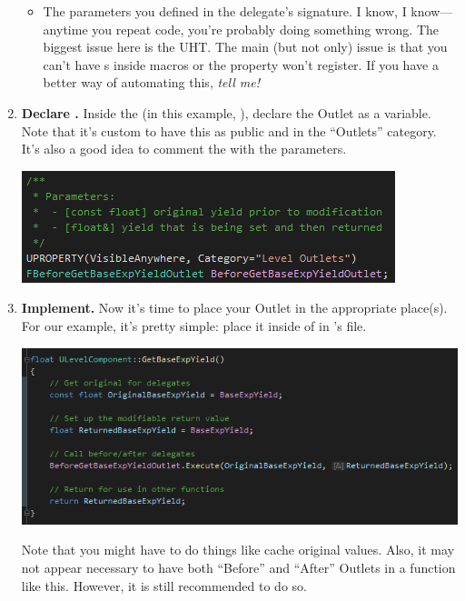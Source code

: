 \begin{enumerate}
{\begin{itemize}
{\begin{tcolorbox}[colback=gray!20!white,colframe=blue!75!black,title=Priorities]
	 \end{tcolorbox}\vspace*{12pt}
			}
			\item{The parameters you defined in the delegate's signature. I know, I know---anytime you repeat code, you're probably doing something wrong. The biggest issue here is the UHT. The main (but not only) issue is that you can't have s inside macros or the property won't register. If you have a better way of automating this, \textit{tell me!}}
		\end{itemize}
	}
	\item{\textbf{Declare .} Inside the  (in this example, ), declare the Outlet as a variable. Note that it's custom to have this  as public and in the ``Outlets'' category. It's also a good idea to comment the  with the parameters.
	\begin{center}
		\includegraphics[scale=\ScreenshotScale]{create-outlet-uproperty}
	\end{center}
	}
	\item{\textbf{Implement.} Now it's time to place your Outlet in the appropriate place(s). For our example, it's pretty simple: place it inside of  in 's  file.
	\begin{center}
		\includegraphics[scale=\ScreenshotScale]{create-outlet-cpp}
	\end{center}
	Note that you might have to do things like cache original values. Also, it may not appear necessary to have both ``Before'' and ``After'' Outlets in a function like this. However, it is still recommended to do so.
}
\end{enumerate}
